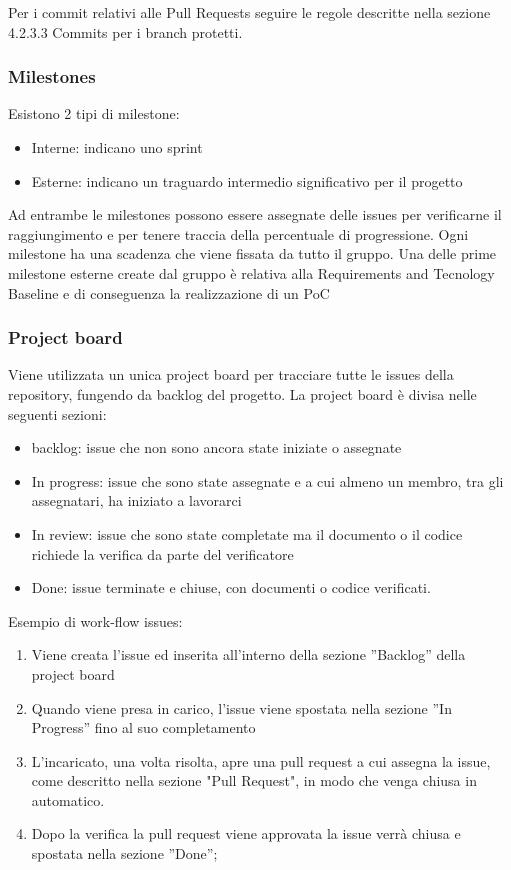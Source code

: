         Per i commit relativi alle Pull Requests seguire le regole descritte nella sezione 4.2.3.3 Commits per i
        branch protetti.

        \subsubsection{Milestones}
        Esistono 2 tipi di milestone:
        \begin{itemize}
            \item Interne: indicano uno sprint
            \item Esterne: indicano un traguardo intermedio significativo per il progetto
        \end{itemize}
        Ad entrambe le milestones possono essere assegnate delle issues per verificarne il raggiungimento e per tenere traccia
        della percentuale di progressione.
        Ogni milestone ha una scadenza che viene fissata da tutto il gruppo. Una delle prime milestone esterne create dal gruppo è
        relativa alla Requirements and Tecnology Baseline e di conseguenza la realizzazione di un PoC


        \subsubsection{Project board}
        Viene utilizzata un unica project board per tracciare tutte le issues della repository, fungendo da backlog del progetto.
        La project board è divisa nelle seguenti sezioni:
        \begin{itemize}
            \item backlog: issue che non sono ancora state iniziate o assegnate
            \item In progress: issue che sono state assegnate e a cui almeno un membro, tra gli assegnatari, ha iniziato a lavorarci
            \item In review: issue che sono state completate ma il documento o il codice richiede la verifica da parte del verificatore
            \item Done: issue terminate e chiuse, con documenti o codice verificati.
        \end{itemize}
        Esempio di work-flow issues:
        \begin{enumerate}
            \item Viene creata l'issue ed inserita all'interno della sezione ”Backlog” della project board
            \item Quando viene presa in carico, l'issue viene spostata nella sezione ”In Progress” fino al suo completamento
            \item L'incaricato, una volta risolta, apre una pull request a cui assegna la issue, come descritto nella sezione "Pull Request", in modo che
                venga chiusa in automatico.
            \item Dopo la verifica la pull request viene approvata la issue verrà chiusa e spostata nella sezione ”Done”;
        \end{enumerate}


